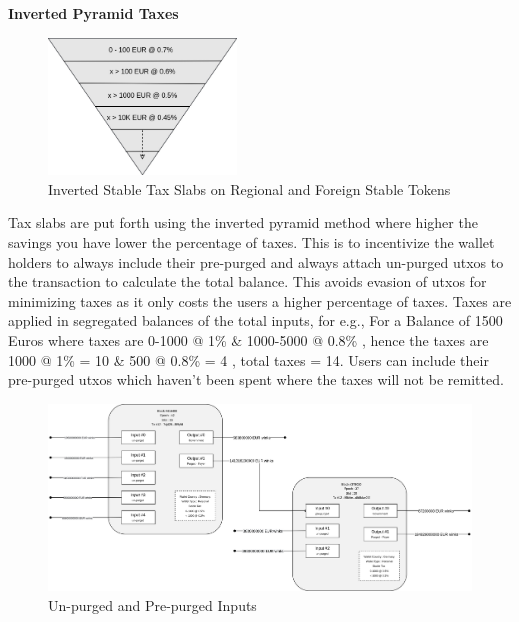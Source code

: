 \documentclass[letterpaper,11pt]{article}
\begin{document}
\textbf{Inverted Pyramid Taxes}\\

\begin{figure}[H]
\begin{center}
\includegraphics[width=5cm]{invertedtriangle}
\caption{Inverted Stable Tax Slabs on Regional and Foreign Stable Tokens}
\end{center}
\end{figure}

Tax slabs are put forth using the inverted pyramid method where higher the savings you have lower the percentage of taxes. This is to incentivize the wallet holders to always include their pre-purged and always attach un-purged utxos to the transaction to calculate the total balance. This avoids evasion of utxos for minimizing taxes as it only costs the users a higher percentage of taxes. Taxes are applied in segregated balances of the total inputs, for e.g., For a Balance of 1500 Euros where taxes are 0-1000 @ 1\% \& 1000-5000 @ 0.8\% , hence the taxes are 1000 @ 1\% = 10 \& 500 @ 0.8\% = 4 , total taxes = 14. Users can include their pre-purged utxos which haven't been spent where the taxes will not be remitted.\\

\begin{figure}
\begin{center}
\includegraphics[width=\textwidth]{stabletaxfig2}
\caption{Un-purged and Pre-purged Inputs}
\end{center}
\end{figure}
\end{document}
